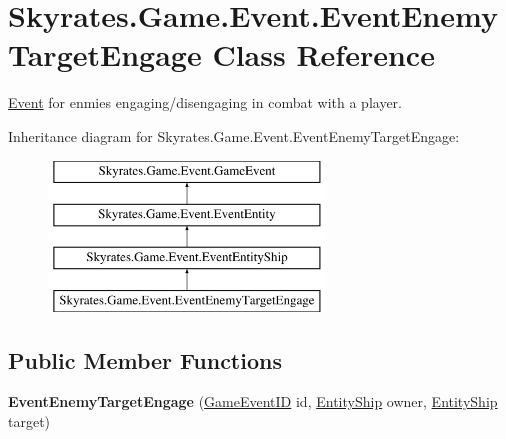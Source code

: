 \hypertarget{class_skyrates_1_1_game_1_1_event_1_1_event_enemy_target_engage}{\section{Skyrates.\-Game.\-Event.\-Event\-Enemy\-Target\-Engage Class Reference}
\label{class_skyrates_1_1_game_1_1_event_1_1_event_enemy_target_engage}
}


\hyperlink{namespace_skyrates_1_1_game_1_1_event}{Event} for enmies engaging/disengaging in combat with a player.  


Inheritance diagram for Skyrates.\-Game.\-Event.\-Event\-Enemy\-Target\-Engage\-:\begin{figure}[H]
\begin{center}
\leavevmode
\includegraphics[height=4.000000cm]{class_skyrates_1_1_game_1_1_event_1_1_event_enemy_target_engage}
\end{center}
\end{figure}
\subsection*{Public Member Functions}
\begin{DoxyCompactItemize}
\item 
\hypertarget{class_skyrates_1_1_game_1_1_event_1_1_event_enemy_target_engage_a5ed57fe67be7020d2633df2b1de0b026}{{\bfseries Event\-Enemy\-Target\-Engage} (\hyperlink{namespace_skyrates_1_1_game_1_1_event_ad31565d2f03f234f8f77ebf23ff8f150}{Game\-Event\-I\-D} id, \hyperlink{class_skyrates_1_1_entity_1_1_entity_ship}{Entity\-Ship} owner, \hyperlink{class_skyrates_1_1_entity_1_1_entity_ship}{Entity\-Ship} target)}\label{class_skyrates_1_1_game_1_1_event_1_1_event_enemy_target_engage_a5ed57fe67be7020d2633df2b1de0b026}

\end{DoxyCompactItemize}
